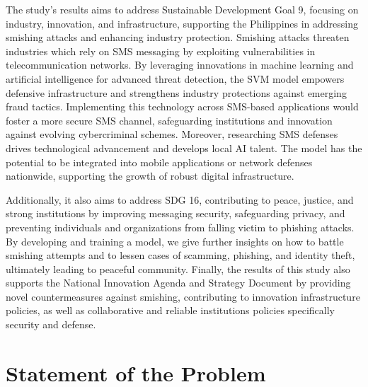 \documentclass[conference]{IEEEtran}
\begin{document}

The study's results aims to address Sustainable Development Goal 9, focusing on industry, innovation, and infrastructure, supporting the Philippines in addressing smishing attacks and enhancing industry protection. Smishing attacks threaten industries which rely on SMS messaging by exploiting vulnerabilities in telecommunication networks. By leveraging innovations in machine learning and artificial intelligence for advanced threat detection, the SVM model empowers defensive infrastructure and strengthens industry protections against emerging fraud tactics. Implementing this technology across SMS-based applications would foster a more secure SMS channel, safeguarding institutions and innovation against evolving cybercriminal schemes. Moreover, researching SMS defenses drives technological advancement and develops local AI talent. The model has the potential to be integrated into mobile applications or network defenses nationwide, supporting the growth of robust digital infrastructure.

Additionally, it also aims to address SDG 16, contributing to peace, justice, and strong institutions by improving messaging security, safeguarding privacy, and preventing individuals and organizations from falling victim to phishing attacks. By developing and training a model, we give further insights on how to battle smishing attempts and to lessen cases of scamming, phishing, and identity theft, ultimately leading to peaceful community. Finally, the results of this study also supports the National Innovation Agenda and Strategy Document by providing novel countermeasures against smishing, contributing to innovation infrastructure policies, as well as collaborative and reliable institutions policies specifically security and defense.

\section{Statement of the Problem}
\end{document}
